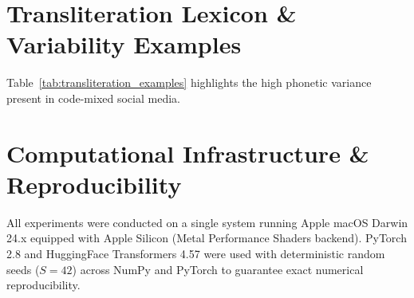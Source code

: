 \documentclass[10pt,journal,compsoc]{IEEEtran}
\begin{document}
\section{Transliteration Lexicon \& Variability Examples}
Table~\ref{tab:transliteration_examples} highlights the high phonetic variance present in code-mixed social media.

\begin{table}[t]
\centering
\caption{Examples of Orthographic and Phonetic Variability in Indic Code-Mixed Dialects}
\label{tab:transliteration_examples}
\end{table}

\section{Computational Infrastructure \& Reproducibility}
All experiments were conducted on a single system running Apple macOS Darwin 24.x equipped with Apple Silicon (Metal Performance Shaders backend). PyTorch 2.8 and HuggingFace Transformers 4.57 were used with deterministic random seeds ($S=42$) across NumPy and PyTorch to guarantee exact numerical reproducibility.
\end{document}
